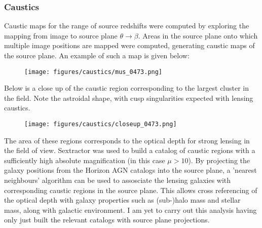 \documentclass{beamer}
\begin{document}
  \begin{frame}
    \frametitle{\sc Caustics}
    Caustic maps for the range of source redshifts were computed by exploring the mapping from image to source plane $\theta \rightarrow \beta$. Areas in the source plane onto which multiple image positions are mapped were computed, generating caustic maps of the source plane. An example of such a map is given below:

    \begin{figure}
      \centering
      \texttt{[image: figures/caustics/mus\_0473.png]}
    \end{figure}
  \end{frame}

  \begin{frame}
    Below is a close up of the caustic region corresponding to the largest cluster in the field. Note the astroidal shape, with cusp singularities expected with lensing caustics.

    \begin{figure}
      \centering
      \texttt{[image: figures/caustics/closeup\_0473.png]}
    \end{figure}
  \end{frame}

  \begin{frame}
    The area of these regions corresponds to the optical depth for strong lensing in the field of view. Sextractor was used to build a catalog of caustic regions with a sufficiently high absolute magnification (in this case $\mu > 10$). By projecting the galaxy positions from the Horizon AGN catalogs into the source plane, a 'nearest neighbours' algorithm can be used to assosciate the lensing galaxies with corresponding caustic regions in the source plane. This allows cross referencing of the optical depth with galaxy properties such as (sub-)halo mass and stellar mass, along with galactic environment. I am yet to carry out this analysis having only just built the relevant catalogs with source plane projections.
  \end{frame}
\end{document}
